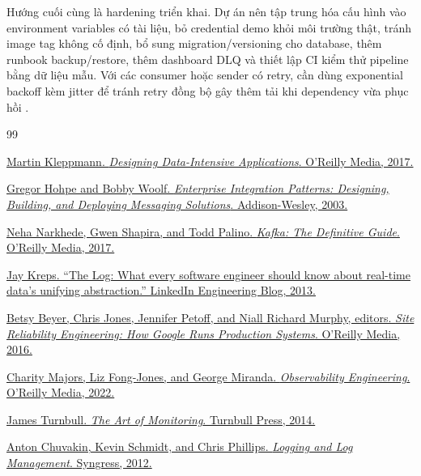 Hướng cuối cùng là hardening triển khai. Dự án nên tập trung hóa cấu hình vào environment variables có tài liệu, bỏ credential demo khỏi môi trường thật, tránh image tag không cố định, bổ sung migration/versioning cho database, thêm runbook backup/restore, thêm dashboard DLQ và thiết lập CI kiểm thử pipeline bằng dữ liệu mẫu. Với các consumer hoặc sender có retry, cần dùng exponential backoff kèm jitter để tránh retry đồng bộ gây thêm tải khi dependency vừa phục hồi \cite{brookerJitter}.

\begin{thebibliography}{99}

\href{https://dataintensive.net/}{Martin Kleppmann. \textit{Designing Data-Intensive Applications}. O'Reilly Media, 2017.}

\href{https://www.enterpriseintegrationpatterns.com/}{Gregor Hohpe and Bobby Woolf. \textit{Enterprise Integration Patterns: Designing, Building, and Deploying Messaging Solutions}. Addison-Wesley, 2003.}

\href{https://www.oreilly.com/library/view/kafka-the-definitive/9781491936153/}{Neha Narkhede, Gwen Shapira, and Todd Palino. \textit{Kafka: The Definitive Guide}. O'Reilly Media, 2017.}

\href{https://engineering.linkedin.com/distributed-systems/log-what-every-software-engineer-should-know-about-real-time-datas-unifying}{Jay Kreps. ``The Log: What every software engineer should know about real-time data's unifying abstraction.'' LinkedIn Engineering Blog, 2013.}

\href{https://sre.google/books/}{Betsy Beyer, Chris Jones, Jennifer Petoff, and Niall Richard Murphy, editors. \textit{Site Reliability Engineering: How Google Runs Production Systems}. O'Reilly Media, 2016.}

\href{https://www.oreilly.com/library/view/observability-engineering/9781492076438/}{Charity Majors, Liz Fong-Jones, and George Miranda. \textit{Observability Engineering}. O'Reilly Media, 2022.}

\href{https://www.artofmonitoring.com/}{James Turnbull. \textit{The Art of Monitoring}. Turnbull Press, 2014.}

\href{https://www.sciencedirect.com/book/9781597496353/logging-and-log-management}{Anton Chuvakin, Kevin Schmidt, and Chris Phillips. \textit{Logging and Log Management}. Syngress, 2012.}


\end{thebibliography}
